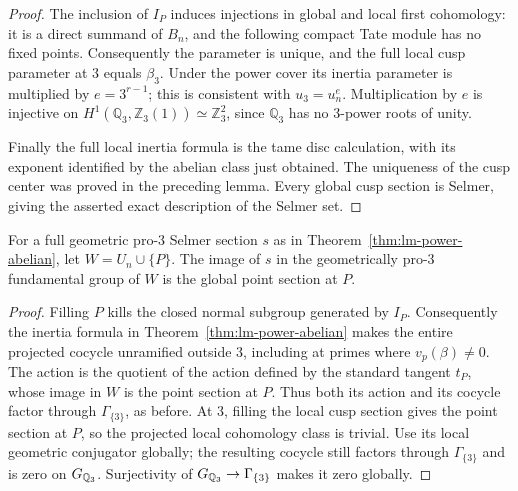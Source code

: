 \begin{proof}
The inclusion of $I_P$ induces injections in global
and local first cohomology: it is a direct summand of
$B_n$, and the following compact Tate module has no
fixed points.  Consequently the parameter is unique,
and the full local cusp parameter at $3$ equals
$\beta_3$.  Under the power cover its inertia parameter
is multiplied by $e=3^{r-1}$; this is consistent with
$u_3=u_n^e$.  Multiplication by $e$ is injective on
$H^1(\mathbb Q_3,\mathbb Z_3(1))
 \simeq\mathbb Z_3^2$, since $\mathbb Q_3$ has no
$3$-power roots of unity.

Finally the full local inertia formula is the tame
disc calculation, with its exponent identified by
the abelian class just obtained.  The uniqueness of
the cusp center was proved in the preceding lemma.
Every global cusp section is Selmer, giving the
asserted exact description of the Selmer set.
\end{proof}

\begin{corollary}
\label{cor:lm-fill-full}
For a full geometric pro-$3$ Selmer section $s$ as in
Theorem~\ref{thm:lm-power-abelian}, let $W=U_n\cup\{P\}$.
The image of $s$ in the geometrically pro-$3$ fundamental group of
$W$ is the global point section at $P$.
\end{corollary}
\begin{proof}
Filling $P$ kills the closed normal subgroup generated by $I_P$.
Consequently the inertia formula in
Theorem~\ref{thm:lm-power-abelian} makes the entire projected
cocycle unramified outside $3$, including at primes where
$v_p(\beta)\ne0$.  The action is the quotient of the action defined
by the standard tangent $t_P$, whose image in $W$ is the point
section at $P$.  Thus both its action and its cocycle factor through
$\Gamma_{\{3\}}$, as before.  At $3$, filling the local cusp section
gives the point section at $P$, so the projected local cohomology
class is trivial.  Use its local geometric conjugator globally;
the resulting cocycle still factors through $\Gamma_{\{3\}}$ and
is zero on $G_{\mathbb Q_3}$.  Surjectivity of
$G_{\mathbb Q_3}\to\Gamma_{\{3\}}$ makes it zero globally.
\end{proof}

